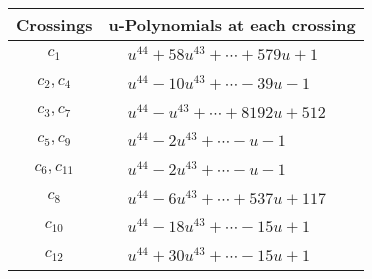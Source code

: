 \documentclass[1p]{elsarticle_modified}
\theoremstyle{definition}
\begin{document}
\begin{tabular}{m{50pt}|m{274pt}}
Crossings & \hspace{64pt}u-Polynomials at each crossing \\
\hline $$\begin{aligned}c_{1}\end{aligned}$$&$\begin{aligned}
&u^{44}+58 u^{43}+\cdots+579 u+1
\end{aligned}$\\
\hline $$\begin{aligned}c_{2},c_{4}\end{aligned}$$&$\begin{aligned}
&u^{44}-10 u^{43}+\cdots-39 u-1
\end{aligned}$\\
\hline $$\begin{aligned}c_{3},c_{7}\end{aligned}$$&$\begin{aligned}
&u^{44}- u^{43}+\cdots+8192 u+512
\end{aligned}$\\
\hline $$\begin{aligned}c_{5},c_{9}\end{aligned}$$&$\begin{aligned}
&u^{44}-2 u^{43}+\cdots- u-1
\end{aligned}$\\
\hline $$\begin{aligned}c_{6},c_{11}\end{aligned}$$&$\begin{aligned}
&u^{44}-2 u^{43}+\cdots- u-1
\end{aligned}$\\
\hline $$\begin{aligned}c_{8}\end{aligned}$$&$\begin{aligned}
&u^{44}-6 u^{43}+\cdots+537 u+117
\end{aligned}$\\
\hline $$\begin{aligned}c_{10}\end{aligned}$$&$\begin{aligned}
&u^{44}-18 u^{43}+\cdots-15 u+1
\end{aligned}$\\
\hline $$\begin{aligned}c_{12}\end{aligned}$$&$\begin{aligned}
&u^{44}+30 u^{43}+\cdots-15 u+1
\end{aligned}$\\
\hline
\end{tabular}\\~\\
\end{document}
